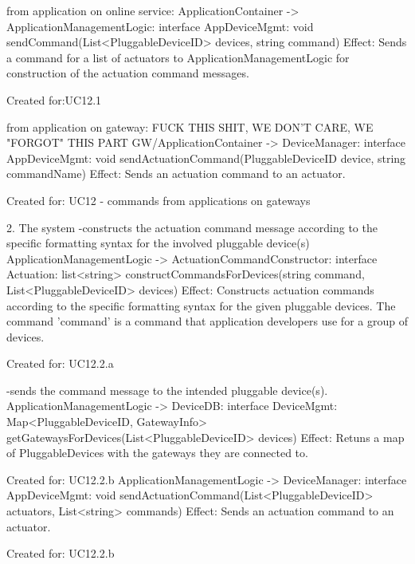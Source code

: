                 from application on online service:
                    ApplicationContainer -> ApplicationManagementLogic: interface AppDeviceMgmt: void sendCommand(List<PluggableDeviceID> devices, string command)
                        Effect: Sends a command for a list of actuators to ApplicationManagementLogic for construction of the actuation command messages.
                        \item Created for:UC12.1

                from application on gateway: FUCK THIS SHIT, WE DON'T CARE, WE "FORGOT" THIS PART
                    GW/ApplicationContainer -> DeviceManager: interface AppDeviceMgmt: void sendActuationCommand(PluggableDeviceID device, string commandName)
                        Effect: Sends an actuation command to an actuator.
                        \item Created for: UC12 - commands from applications on gateways


            2. The system
                -constructs the actuation command message according to the specific formatting syntax for the involved pluggable device(s)
                    ApplicationManagementLogic -> ActuationCommandConstructor:  interface Actuation:  list<string> constructCommandsForDevices(string command, List<PluggableDeviceID> devices)
                        Effect: Constructs actuation commands according to the specific formatting syntax for the given pluggable devices. The command 'command' is a command that application developers use for a group of devices.
                        \item Created for: UC12.2.a

                -sends the command message to the intended pluggable device(s).
                    ApplicationManagementLogic -> DeviceDB:      interface DeviceMgmt:    Map<PluggableDeviceID, GatewayInfo> getGatewaysForDevices(List<PluggableDeviceID> devices)
                        Effect: Retuns a map of PluggableDevices with the gateways they are connected to.
                        \item Created for: UC12.2.b
                    ApplicationManagementLogic -> DeviceManager: interface AppDeviceMgmt: void sendActuationCommand(List<PluggableDeviceID> actuators, List<string> commands)
                        Effect: Sends an actuation command to an actuator.
                        \item Created for: UC12.2.b

